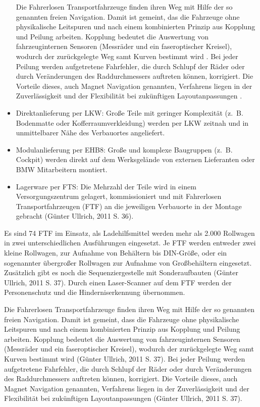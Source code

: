 \begin{itemize}
Die Fahrerlosen Transportfahrzeuge finden ihren Weg mit Hilfe der so genannten freien Navigation. Damit ist gemeint, das die Fahrzeuge ohne physikalische Leitspuren und nach einem kombinierten Prinzip aus Kopplung und Peilung arbeiten. Kopplung bedeutet die Auswertung von fahrzeuginternen Sensoren (Messr\"ader und ein faseroptischer Kreisel), wodurch der zur\"uckgelegte Weg samt Kurven bestimmt wird \cite[S. 36]{Guenther:2011}. Bei jeder Peilung werden aufgetretene Fahrfehler, die durch Schlupf der R\"ader oder durch Ver\"anderungen des Raddurchmessers auftreten k\"onnen, korrigiert. Die Vorteile dieses, auch Magnet Navigation genannten, Verfahrens liegen in der Zuverl\"assigkeit und der Flexibilit\"at bei zuk\"unftigen Layoutanpassungen \cite[S. 36]{Guenther:2011}.

\item Direktanlieferung per LKW:
Gro\ss e Teile mit geringer Komplexit\"at (z.~B. Bodenmatte oder Kofferraumverkleidung) werden per LKW zeitnah und in unmittelbarer N\"ahe des Verbauortes angeliefert.
\item Modulanlieferung per EHB8:
Gro\ss e und komplexe Baugruppen (z.~B. Cockpit) werden direkt auf dem Werksgel\"ande von externen Lieferanten oder BMW Mitarbeitern montiert.
\item Lagerware per FTS:
Die Mehrzahl der Teile wird in einem Versorgungszentrum gelagert, kommissioniert und mit Fahrerlosen Transportfahrzeugen (FTF) an die jeweiligen Verbauorte in der Montage gebracht (G\"unter Ullrich, 2011 S. 36).\end{itemize}
Es sind 74 FTF im Einsatz, als Ladehilfsmittel werden mehr als 2.000 Rollwagen in zwei unterschiedlichen Ausf\"uhrungen eingesetzt.
Je FTF werden entweder zwei kleine Rollwagen, zur Aufnahme von Beh\"altern bis DIN-Gr\"o\ss e, oder ein sogenannter \"ubergro\ss er Rollwagen zur Aufnahme von Gro\ss beh\"altern eingesetzt.
Zus\"atzlich gibt es noch die Sequenziergestelle mit Sonderaufbauten (G\"unter Ullrich, 2011 S. 37).
Durch einen Laser-Scanner auf dem FTF werden der Personenschutz und die Hinderniserkennung \"ubernommen. 

Die Fahrerlosen Transportfahrzeuge finden ihren Weg mit Hilfe der so genannten freien Navigation.
Damit ist gemeint, dass die Fahrzeuge ohne physikalische Leitspuren und nach einem kombinierten Prinzip aus Kopplung und Peilung arbeiten.
Kopplung bedeutet die Auswertung von fahrzeuginternen Sensoren (Messr\"ader und ein faseroptischer Kreisel), wodurch der zur\"uckgelegte Weg samt Kurven bestimmt wird (G\"unter Ullrich, 2011 S. 37).
Bei jeder Peilung werden aufgetretene Fahrfehler, die durch Schlupf der R\"ader oder durch Ver\"anderungen des Raddurchmessers auftreten k\"onnen, korrigiert.
Die Vorteile dieses, auch Magnet Navigation genannten, Verfahrens liegen in der Zuverl\"assigkeit und der Flexibilit\"at bei zuk\"unftigen Layoutanpassungen (G\"unter Ullrich, 2011 S. 37).
